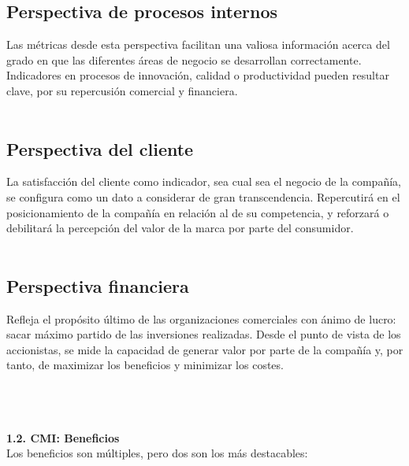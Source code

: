 \documentclass[twoside,twocolumn]{article}
\begin{document}
\begin{flushright}
\begin{itemize}
\subsection{Perspectiva de procesos internos}
Las métricas desde esta perspectiva facilitan una valiosa información acerca del grado en que las diferentes áreas de negocio se desarrollan correctamente. Indicadores en procesos de innovación, calidad o productividad pueden resultar clave, por su repercusión comercial y financiera.
\textbf{}\\\textbf{}\\
\subsection{Perspectiva del cliente}
La satisfacción del cliente como indicador, sea cual sea el negocio  de la compañía, se configura como un dato a considerar de gran transcendencia. Repercutirá en el posicionamiento de la compañía en relación al de su competencia, y reforzará o debilitará la percepción del valor de la marca por parte del consumidor. 
\textbf{}\\\textbf{}\\
\subsection{Perspectiva financiera}
Refleja el propósito último de las organizaciones comerciales con ánimo de lucro: sacar máximo partido de las inversiones realizadas. Desde el punto de vista de los accionistas, se mide la capacidad de generar valor por parte de la compañía y, por tanto, de maximizar los beneficios y minimizar los costes.

\textbf{}\\\textbf{}\\\textbf{}\\
 \textbf{1.2.  CMI: Beneficios }\\

Los beneficios son múltiples, pero dos son los más destacables:\\


\end{itemize}
\end{flushright}
\end{document}
